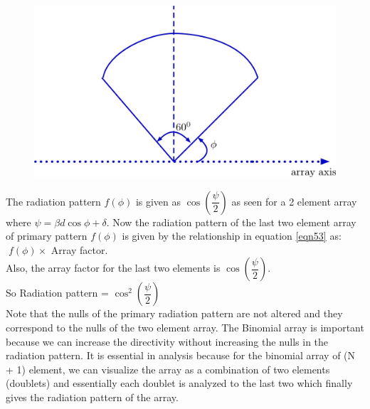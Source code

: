 \begin{figure}[h]
\centering
\includegraphics[width=1\linewidth]{"./graphics/img59_4"}
\caption{}
\label{fig:fig-3}
\end{figure}

The radiation pattern $f(\phi)$ is given as $\cos(\dfrac{\psi}{2})$ as seen for a 2 element array where $\psi = \beta d\cos\phi + \delta$. Now the radiation pattern of the last two element array of primary pattern $f(\phi)$ is given by the relationship in equation \ref{eqn53} as:   $\; f(\phi) \times$ Array factor. \\
Also, the array factor for the last two elements is $\cos(\dfrac{\psi}{2})$.\\
So Radiation pattern = $\cos^2(\dfrac{\psi}{2})$\\
Note that the nulls of the primary radiation pattern are not altered and they correspond to the nulls of the two element array. The Binomial array is important because we can increase the directivity without increasing the nulls in the radiation pattern. It is essential in analysis because for the binomial array of (N + 1) element, we can visualize the array as a combination of two elements (doublets) and essentially each doublet is analyzed to the last two which finally gives the radiation pattern of the array.

